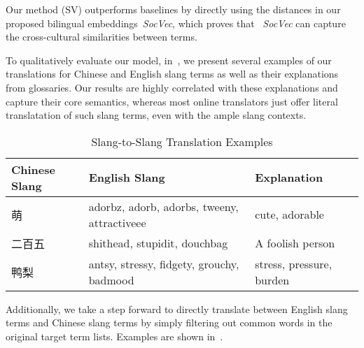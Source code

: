Our method (SV) outperforms baselines by directly using the distances in 
our proposed bilingual embeddings~\textit{SocVec}, which proves 
that ~\textit{SocVec} can capture the cross-cultural similarities between terms.

To qualitatively evaluate our model, in~, 
we present several examples of our translations for Chinese and English slang 
terms as well as their explanations from glossaries.
Our results are highly correlated with these explanations and 
capture their core semantics, whereas most online translators just offer 
literal translatation of such slang terms, even with the ample
slang contexts.
\begin{table}[th]
	\small
	\centering
	\caption{{Slang-to-Slang Translation Examples}}
	\begin{tabular}{|C{1.92cm}|L{2.5cm}|L{2.0cm}|}
		\hline
		\textbf{Chinese Slang} & \textbf{English Slang} & \textbf{Explanation} \\ \hline
		萌 & adorbz, adorb, adorbs, tweeny, attractiveee & cute, adorable \\ \hline
		二百五 & shithead, stupidit, douchbag & A foolish person\\ \hline
		鸭梨 & antsy, stressy, fidgety, grouchy, badmood & stress, pressure, burden \\ \hline
	\end{tabular}
	\label{tab:bleis_4}
\end{table}
Additionally, we take a step forward to directly translate between 
English slang terms and Chinese slang terms by simply filtering out 
common words in the original target term lists. Examples are shown 
in~. 
